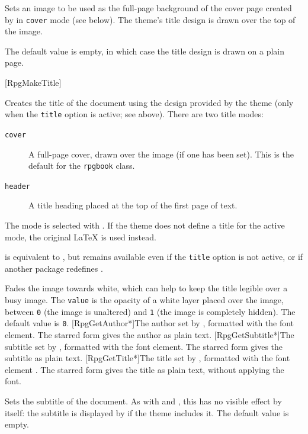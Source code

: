 			{
				Sets an image to be used as the full-page background of the cover page created by  in \texttt{cover} mode (see below). The theme's title design is drawn over the top of the image.

				The default value is empty, in which case the title design is drawn on a plain page.
			}
			[RpgMakeTitle]{\param{}}
			{
				Creates the title of the document using the design provided by the theme (only when the \texttt{title} option is active; see above). There are two title modes:
				\begin{description}
					\item[\texttt{cover}] A full-page cover, drawn over the  image (if one has been set). This is the default for the \texttt{rpgbook} class.
					\item[\texttt{header}] A title heading placed at the top of the first page of text.
				\end{description}
				The mode is selected with . If the theme does not define a title for the active mode, the original \LaTeX{}  is used instead.

				 is equivalent to , but remains available even if the \texttt{title} option is not active, or if another package redefines .

			}
			{
				Fades the  image towards white, which can help to keep the title legible over a busy image. The \texttt{value} is the opacity of a white layer placed over the image, between \texttt{0} (the image is unaltered) and \texttt{1} (the image is completely hidden). The default value is \texttt{0}.
			}
			[RpgGetAuthor*]{The author set by , formatted with the  font element. The starred form gives the author as plain text.}
			[RpgGetSubtitle*]{The subtitle set by , formatted with the  font element. The starred form gives the subtitle as plain text.}
			[RpgGetTitle*]{The title set by , formatted with the  font element . The starred form gives the title as plain text, without applying the font.}

			{
				Sets the subtitle of the document. As with  and , this has no visible effect by itself: the subtitle is displayed by  if the theme includes it. The default value is empty.
			}

